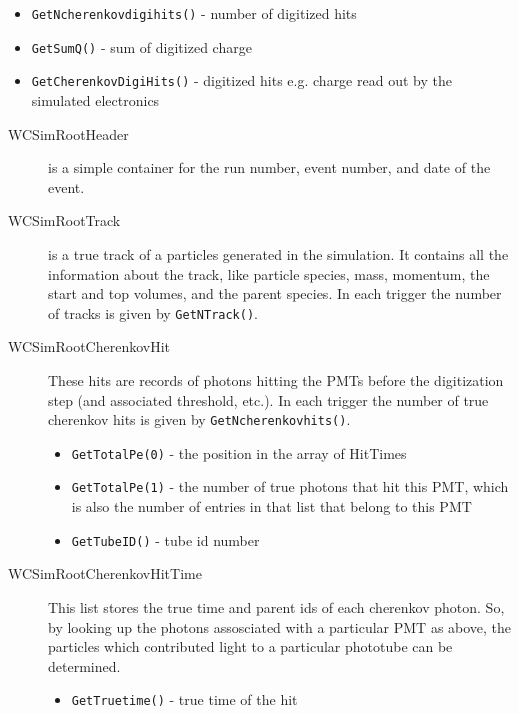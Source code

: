 \begin{description}
\begin{description}
\begin{itemize}
    \item \texttt{GetNcherenkovdigihits()} - number of digitized hits
    \item \texttt{GetSumQ()} - sum of digitized charge
    \item \texttt{GetCherenkovDigiHits()} - digitized hits e.g. charge read out by the simulated electronics 
    \end{itemize}

    \begin{description}
      \item[WCSimRootHeader] is a simple container for the run number, event number, and date of the event.
      \item[WCSimRootTrack] is a true track of a particles generated in the simulation. It contains all the information about the track, like particle species, mass, momentum, the start and top volumes, and the parent species.  In each trigger the number of tracks is given by \texttt{GetNTrack()}.  %
      \item[WCSimRootCherenkovHit] These hits are records of photons hitting the PMTs before the digitization step (and associated threshold, etc.). In each trigger the number of true cherenkov hits is given by \texttt{GetNcherenkovhits()}.
          \begin{itemize}
          \item \texttt{GetTotalPe(0)} - the position in the array of HitTimes
          \item \texttt{GetTotalPe(1)} - the number of true photons that hit this PMT, which is also the number of entries in that list that belong to this PMT
          \item \texttt{GetTubeID()} - tube id number
          \end{itemize}
      \item[WCSimRootCherenkovHitTime] This list stores the true time and parent ids of each cherenkov photon.  So, by looking up the photons assosciated with a particular PMT as above, the particles which contributed light to a particular phototube can be determined.
          \begin{itemize}
          \item \texttt{GetTruetime()} - true time of the hit

\end{itemize}
\end{description}
\end{description}
\end{description}
